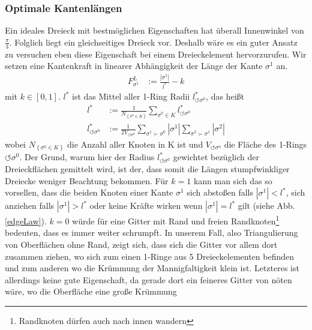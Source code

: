   \subsubsection{Optimale Kantenlängen}
    Ein ideales Dreieck mit bestmöglichen Eigenschaften hat überall Innenwinkel von \( \frac{\pi}{3} \). 
    Folglich liegt ein gleichseitiges Dreieck vor. 
    Deshalb wäre es ein guter Ansatz zu versuchen eben diese Eigenschaft bei einem Dreieckelement hervorzurufen.
    Wir setzen eine Kantenkraft in linearer Abhängigkeit der Länge der Kante \( \sigma^{1} \) an.
    \begin{align}
       F^{L}_{\sigma^{1}} &:= \frac{|\sigma^{1}|}{l^{*}} - k
    \end{align}
    mit \( k \in [0,1] \). \( l^{*} \) ist das Mittel aller 1-Ring Radii \(  l^{*}_{\circlearrowleft\sigma^{0}} \), das heißt
    \begin{align}
      l^{*} &:= \frac{1}{N_{\left\{ \sigma^{0}\in K \right\}}} \sum_{\sigma^{0}\in K } l^{*}_{\circlearrowleft\sigma^{0}} \\
      l^{*}_{\circlearrowleft\sigma^{0}} &:= \frac{1}{2V_{\circlearrowleft\sigma^{0}}} \sum_{\sigma^{1}\succ\sigma^{0}}
                                              |\sigma^{1}| \sum_{\sigma^{2}\succ\sigma^{1}} |\sigma^{2}|      
    \end{align}
    wobei \( N_{\left\{ \sigma^{0}\in K \right\}} \) die Anzahl aller Knoten in K ist 
    und \( V_{\circlearrowleft\sigma^{0}}  \) die Fläche des 1-Rings \( \circlearrowleft\sigma^{0} \).
    Der Grund, warum hier der Radius \( l^{*}_{\circlearrowleft\sigma^{0}} \) gewichtet bezüglich der Dreieckflächen gemittelt wird,
    ist der, dass somit die Längen stumpfwinkliger Dreiecke weniger Beachtung bekommen.
    Für \( k=1 \) kann man sich das so vorsellen, dass die beiden Knoten einer Kante \( \sigma^{1} \) sich abstoßen falls \( |\sigma^{1}| < l^{*}
    \), sich anziehen falls \( |\sigma^{1}| > l^{*}\) oder keine Kräfte wirken wenn \( |\sigma^{1}| = l^{*}\) gilt (siehe Abb. \ref{edgeLaw}).
    \( k = 0 \) würde für eine Gitter mit Rand und freien Randknoten\footnote{Randknoten dürfen auch nach innen wandern} bedeuten, 
    dass es immer weiter schrumpft. In unserem Fall, also Triangulierung von Oberflächen ohne Rand, zeigt sich, dass sich die Gitter vor allem dort
    zusammen ziehen, wo sich zum einen 1-Ringe aus 5 Dreieckelementen befinden und zum anderen wo die Krümmung der Mannigfaltigkeit klein ist.
    Letzteres ist allerdings keine gute Eigenschaft, da gerade dort ein feineres Gitter von nöten wäre, wo die Oberfläche eine große Krümmung
